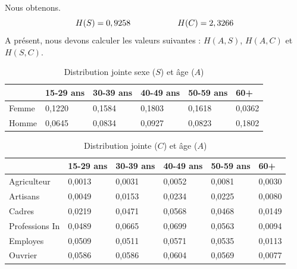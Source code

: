 \documentclass{article}
\begin{document}
Nous obtenons.
\[
H(S) = 0,9258  \hspace{2 cm} H(C)= 2,3266
\]
A présent, nous devons calculer les valeurs suivantes : $H(A,S)$, $H(A,C)$ et $H(S,C)$.\\
\begin{table}[H]
  \centering
  \begin{tabular}{|l|l|l|l|l|l|}
  \hline
        & 15-29 ans & 30-39 ans & 40-49 ans & 50-59 ans & 60+    \\ \hline
  Femme & 0,1220    & 0,1584    & 0,1803    & 0,1618    & 0,0362 \\ \hline
  Homme & 0,0645    & 0,0834    & 0,0927    & 0,0823    & 0,1802 \\ \hline
  \end{tabular}
  \caption{Distribution jointe sexe ($S$) et âge ($A$)}
  \end{table}

  \begin{table}[H]
    \centering
    \begin{tabular}{|l|l|l|l|l|l|}
    \hline
                   & 15-29 ans & 30-39 ans & 40-49 ans & 50-59 ans & 60+    \\ \hline
    Agriculteur    & 0,0013    & 0,0031    & 0,0052    & 0,0081    & 0,0030 \\ \hline
    Artisans       & 0,0049    & 0,0153    & 0,0234    & 0,0225    & 0,0080 \\ \hline
    Cadres         & 0,0219    & 0,0471    & 0,0568    & 0,0468    & 0,0149 \\ \hline
    Professions In & 0,0489    & 0,0665    & 0,0699    & 0,0563    & 0,0094 \\ \hline
    Employes       & 0,0509    & 0,0511    & 0,0571    & 0,0535    & 0,0113 \\ \hline
    Ouvrier        & 0,0586    & 0,0586    & 0,0604    & 0,0569    & 0,0077 \\ \hline
    \end{tabular}
    \caption{Distribution jointe ($C$) et âge ($A$)}
    
  \end{table}
\end{document}
